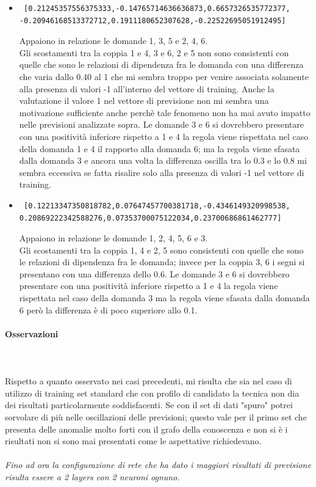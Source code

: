 \documentclass[11pt,a4paper,italian]{article}
\begin{document}
\begin{itemize}
\item \begin{verbatim} [0.21245357556375333,-0.14765714636636873,0.6657326535772377,
-0.20946168513372712,0.1911180652307628,-0.22522695051912495]
\end{verbatim}
Appaiono in relazione le domande 1, 3, 5  e 2, 4, 6.\\
Gli scostamenti tra la coppia 1 e 4, 3 e 6, 2 e 5 non sono consistenti con quelle che sono le relazioni di dipendenza fra le domanda con una differenza che varia dallo 0.40 al 1 che mi sembra troppo per venire associata solamente alla presenza di valori -1 all'interno del vettore di training. Anche la valutazione il valore 1 nel vettore di previsione non mi sembra una motivazione sufficiente anche perch\`e tale fenomeno non ha mai avuto impatto nelle previsioni analizzate sopra.
Le domande 3 e 6 si dovrebbero presentare con una positivit\`a inferiore rispetto a 1 e 4 la regola viene rispettata nel caso della domanda 1 e 4 il rapporto alla domanda 6; ma la regola viene sfasata dalla domanda 3 e ancora una volta la differenza oscilla tra lo 0.3 e lo 0.8 mi sembra eccessiva se fatta risalire solo alla presenza di valori -1 nel vettore di training.


\item \begin{verbatim} [0.12213347350818782,0.07647457700381718,-0.4346149320998538,
0.20869222342588276,0.07353700075122034,0.23700686861462777]
\end{verbatim}
Appaiono in relazione le domande 1, 2, 4, 5, 6 e 3.\\
Gli scostamenti tra la coppia 1, 4 e 2, 5 sono consistenti con quelle che sono le relazioni di dipendenza fra le domanda; invece per la coppia 3, 6 i segni si presentano con una differenza dello 0.6.
Le domande 3 e 6 si dovrebbero presentare con una positivit\`a inferiore rispetto a 1 e 4 la regola viene rispettata nel caso della domanda 3 ma la regola viene sfasata dalla domanda 6 per\`o la differenza \`e di poco superiore allo 0.1.
\end{itemize}

\paragraph{Osservazioni}\mbox{}
\label{Osservazioni su rete a 4 neuroni per 1 unico layers}
\\\\
\noindent
Rispetto a quanto osservato nei casi precedenti, mi risulta che sia nel caso di utilizzo di training set standard che con profilo di candidato la tecnica non dia dei risultati particolarmente soddisfacenti. Se con il set di dati "spuro" potrei sorvolare di pi\`u nelle oscillazioni delle previsioni; questo vale per il primo set che presenta delle anomalie molto forti con il grafo della conoscenza e non si \`e i risultati non si sono mai presentati come le aspettative richiedevano.
\\\\
\noindent
\textit{Fino ad ora la configurazione di rete che ha dato i maggiori risultati di previsione risulta essere a 2 layers con 2 neuroni ognuno.}
\end{document}
